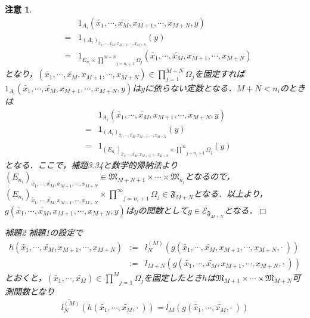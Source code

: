 \documentclass[a4paper,11pt]{jsarticle}
\def\qed{\hfill $\Box$}
\newtheorem{attention}{注意}
\begin{document}
\begin{attention}
\begin{eqnarray*}
&&1_{A_i}(\widetilde{x_1},\cdots,\widetilde{x_M},x_{M+1},\cdots,x_{M+N},y) \\
&=&1_{(A_i)_{\widetilde{x_1},\cdots,\widetilde{x_M},x_{M+1},\cdots,x_{M+N}}}(y) \\
&=&1_{E_{n_i}\times\underset{j=n_i+1}{\overset{M+N}{\prod}}\Omega_j}(\widetilde{x_1},\cdots,\widetilde{x_M},x_{M+1},\cdots,x_{M+N})
\end{eqnarray*}
となり，$\displaystyle (\widetilde{x_1},\cdots,\widetilde{x_M},x_{M+1},\cdots,x_{M+N})\in\prod_{j=1}^{M+N}\Omega_j$を固定すれば$1_{A_i}(\widetilde{x_1},\cdots,\widetilde{x_M},x_{M+1},\cdots,x_{M+N},y)$は$y$に依らない定数となる．$M+N<n_i$のときは
\begin{eqnarray*}
&&1_{A_i}(\widetilde{x_1},\cdots,\widetilde{x_M},x_{M+1},\cdots,x_{M+N},y) \\
&=&1_{(A_i)_{\widetilde{x_1},\cdots,\widetilde{x_M},x_{M+1},\cdots,x_{M+N}}}(y) \\
&=&1_{(E_{n_i})_{\widetilde{x_1},\cdots,\widetilde{x_M},x_{M+1},\cdots,x_{M+N}}\times\underset{j=n_i+1}{\overset{\infty}{\prod}}\Omega_j}(y)
\end{eqnarray*}
となる．ここで，補題3.34と数学的帰納法より$(E_{n_i})_{\widetilde{x_1},\cdots,\widetilde{x_M},x_{M+1},\cdots,x_{M+N}}\in\mathfrak{M}_{M+N+1}\times\cdots\times\mathfrak{M}_{n_i}$となるので，$(E_{n_i})_{\widetilde{x_1},\cdots,\widetilde{x_M},x_{M+1},\cdots,x_{M+N}}\times\underset{j=n_i+1}{\overset{\infty}{\prod}}\Omega_j\in\mathfrak{F}_{M+N}$となる．以上より，$g(\widetilde{x_1},\cdots,\widetilde{x_M},x_{M+1},\cdots,x_{M+N},y)$は$y$の関数として$g\in\mathcal{E}_{\mathfrak{F}_{M+N}}$となる．\qed
\begin{itembox}[l]{補題2}
補題1の設定で
\begin{eqnarray*}
h(\widetilde{x_1},\cdots,\widetilde{x_M},x_{M+1},\cdots,x_{M+N})&:=&l^{(M)}_N(g(\widetilde{x_1},\cdots,\widetilde{x_M},x_{M+1},\cdots,x_{M+N},\cdot{\ })) \\
&:=&l_{M+N}(g(\widetilde{x_1},\cdots,\widetilde{x_M},x_{M+1},\cdots,x_{M+N},\cdot{\ }))
\end{eqnarray*}
とおくと，$(\widetilde{x_1},\cdots,\widetilde{x_M})\in\underset{j=1}{\overset{M}{\prod}}\Omega_j$を固定したとき$h$は$\mathfrak{M}_{M+1}\times\cdots\times\mathfrak{M}_{M+N}$可測関数となり
\begin{equation*}
\widetilde{l^{(M)}_N}(h(\widetilde{x_1},\cdots,\widetilde{x_M},\cdot{\ }))=l_M(g(\widetilde{x_1},\cdots,\widetilde{x_M},\cdot{\ }))
\end{equation*}

\end{itembox}
\end{attention}
\end{document}
